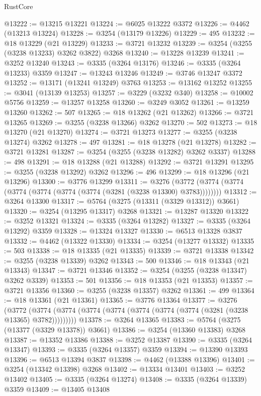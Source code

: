 \begin{lexlean}{RustCore}
\begin{coremodule}
@13222 := @13215 @13221
@13224 := @6025 @13222 @3372
@13226 := @4462 (@13213 @13224)
@13228 := @3254 (@13179 @13226)
@13229 := 495
@13232 := @18 @13229 (@21 @13229)
@13233 := @3721 @13232
@13239 := @3254 (@3255 (@3238 @13233) @3262 @3822) @3268
@13240 := @13228 @13239
@13241 := @3252 @13240
@13243 := @3335 (@3264 @13176)
@13246 := @3335 (@3264 @13233) @3359
@13247 := @13243 @13246
@13249 := @3746 @13247 @3372
@13252 := @13171 (@13241 @13249) @3763
@13253 := @13162 @13252
@13255 := @3041 (@13139 @13253)
@13257 := @3229 (@3232 @340)
@13258 := @10002 @5756
@13259 := @13257 @13258
@13260 := @3249 @3052
@13261 := @13259 @13260
@13262 := 507
@13265 := @18 @13262 (@21 @13262)
@13266 := @3721 @13265
@13269 := @3255 (@3238 @13266) @3262
@13270 := 502
@13273 := @18 @13270 (@21 @13270)
@13274 := @3721 @13273
@13277 := @3255 (@3238 @13274) @3262
@13278 := 497
@13281 := @18 @13278 (@21 @13278)
@13282 := @3721 @13281
@13287 := @3254 (@3255 (@3238 @13282) @3262 @3337)
@13288 := 498
@13291 := @18 @13288 (@21 @13288)
@13292 := @3721 @13291
@13295 := @3255 (@3238 @13292) @3262
@13296 := 496
@13299 := @18 @13296 (@21 @13296)
@13300 := @3776 @13299
@13311 := @3276 (@3772 (@3774 (@3774 (@3774 (@3774 (@3774 (@3774 (@3281 (@3238 @13300) @3783))))))))
@13312 := @3264 @13300
@13317 := @5764 (@3275 (@13311 (@3329 @13312)) @3661)
@13320 := @3254 (@13295 @13317) @3268
@13321 := @13287 @13320
@13322 := @3252 @13321
@13324 := @3335 (@3264 @13282)
@13327 := @3335 (@3264 @13292) @3359
@13328 := @13324 @13327
@13330 := @6513 @13328 @3837
@13332 := @4462 (@13322 @13330)
@13334 := @3254 (@13277 @13332)
@13335 := 503
@13338 := @18 @13335 (@21 @13335)
@13339 := @3721 @13338
@13342 := @3255 (@3238 @13339) @3262
@13343 := 500
@13346 := @18 @13343 (@21 @13343)
@13347 := @3721 @13346
@13352 := @3254 (@3255 (@3238 @13347) @3262 @3339)
@13353 := 501
@13356 := @18 @13353 (@21 @13353)
@13357 := @3721 @13356
@13360 := @3255 (@3238 @13357) @3262
@13361 := 499
@13364 := @18 @13361 (@21 @13361)
@13365 := @3776 @13364
@13377 := @3276
    (@3772 (@3774 (@3774 (@3774 (@3774 (@3774 (@3774 (@3774 (@3281 (@3238 @13365) @3782)))))))))
@13378 := @3264 @13365
@13383 := @5764 (@3275 (@13377 (@3329 @13378)) @3661)
@13386 := @3254 (@13360 @13383) @3268
@13387 := @13352 @13386
@13388 := @3252 @13387
@13390 := @3335 (@3264 @13347)
@13393 := @3335 (@3264 @13357) @3359
@13394 := @13390 @13393
@13396 := @6513 @13394 @3837
@13398 := @4462 (@13388 @13396)
@13401 := @3254 (@13342 @13398) @3268
@13402 := @13334 @13401
@13403 := @3252 @13402
@13405 := @3335 (@3264 @13274)
@13408 := @3335 (@3264 @13339) @3359
@13409 := @13405 @13408

\end{coremodule}
\end{lexlean}
